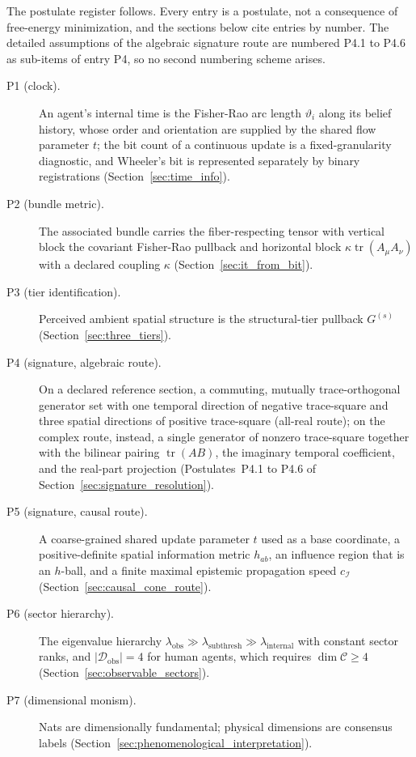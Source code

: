 The postulate register follows. Every entry is a postulate, not a consequence of free-energy minimization, and the sections below cite entries by number. The detailed assumptions of the algebraic signature route are numbered P4.1 to P4.6 as sub-items of entry P4, so no second numbering scheme arises.
\begin{description}
\item[P1 (clock).] An agent's internal time is the Fisher-Rao arc length $\vartheta_i$ along its belief history, whose order and orientation are supplied by the shared flow parameter $t$; the bit count of a continuous update is a fixed-granularity diagnostic, and Wheeler's bit is represented separately by binary registrations (Section~\ref{sec:time_info}).
\item[P2 (bundle metric).] The associated bundle carries the fiber-respecting tensor with vertical block the covariant Fisher-Rao pullback and horizontal block $\kappa\operatorname{tr}(A_\mu A_\nu)$ with a declared coupling $\kappa$ (Section~\ref{sec:it_from_bit}).
\item[P3 (tier identification).] Perceived ambient spatial structure is the structural-tier pullback $G^{(s)}$ (Section~\ref{sec:three_tiers}).
\item[P4 (signature, algebraic route).] On a declared reference section, a commuting, mutually trace-orthogonal generator set with one temporal direction of negative trace-square and three spatial directions of positive trace-square (all-real route); on the complex route, instead, a single generator of nonzero trace-square together with the bilinear pairing $\operatorname{tr}(AB)$, the imaginary temporal coefficient, and the real-part projection (Postulates~P4.1 to P4.6 of Section~\ref{sec:signature_resolution}).
\item[P5 (signature, causal route).] A coarse-grained shared update parameter $t$ used as a base coordinate, a positive-definite spatial information metric $h_{ab}$, an influence region that is an $h$-ball, and a finite maximal epistemic propagation speed $c_\mathcal{I}$ (Section~\ref{sec:causal_cone_route}).
\item[P6 (sector hierarchy).] The eigenvalue hierarchy $\lambda_{\text{obs}} \gg \lambda_{\text{subthresh}} \gg \lambda_{\text{internal}}$ with constant sector ranks, and $|\mathcal{D}_{\text{obs}}| = 4$ for human agents, which requires $\dim\mathcal{C} \ge 4$ (Section~\ref{sec:observable_sectors}).
\item[P7 (dimensional monism).] Nats are dimensionally fundamental; physical dimensions are consensus labels (Section~\ref{sec:phenomenological_interpretation}).

\end{description}

